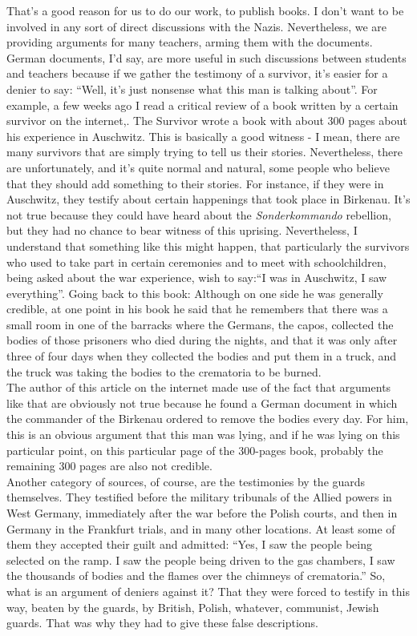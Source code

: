 That's a good reason for us to do our work, to publish books. I don’t want to be involved in any sort of direct discussions with the Nazis. Nevertheless, we are providing arguments for many teachers, arming them with the documents. German documents, I'd say, are more useful in such discussions between students and teachers because if we gather the testimony of a survivor, it’s easier for a denier to say: ``Well, it’s just nonsense what this man is talking about''. For example, a few weeks ago I read a critical review of a book written by a certain survivor on the internet,. The Survivor wrote a book with about 300 pages about his experience in Auschwitz. This is basically a good witness - I mean, there are many survivors that are simply trying to tell us their stories. Nevertheless, there are unfortunately, and it's quite normal and natural, some people who believe that they should add something to their stories. For instance, if they were in Auschwitz, they testify about certain happenings that took place in Birkenau. It’s not true because they could have heard about the \textit{Sonderkommando} rebellion, but they had no chance to bear witness of this uprising. Nevertheless, I understand that something like this might happen, that particularly the survivors who used to take part in certain ceremonies and to meet with schoolchildren, being asked about the war experience, wish to say:``I was in Auschwitz, I saw everything''. Going back to this book: Although on one side he was generally credible, at one point in his book he said that he remembers that there was a small room in one of the barracks where the Germans, the capos, collected the bodies of those prisoners who died during the nights, and that it was only after three of four days when they collected the bodies and put them in a truck, and the truck was taking the bodies to the crematoria to be burned.\\
The author of this article on the internet made use of the fact that arguments like that are obviously not true because he found a German document in which the commander of the Birkenau ordered to remove the bodies every day. For him, this is an obvious argument that this man was lying, and if he was lying on this particular point, on this particular page of the 300-pages book, probably the remaining 300 pages are also not credible.\\
Another category of sources, of course, are the testimonies by the guards themselves. They testified before the military tribunals of the Allied powers in West Germany, immediately after the war before the Polish courts, and then in Germany in the Frankfurt trials, and in many other locations. At least some of them they accepted their guilt and admitted: ``Yes, I saw the people being selected on the ramp. I saw the people being driven to the gas chambers, I saw the thousands of bodies and the flames over the chimneys of crematoria.'' So, what is an argument of deniers against it? That they were forced to testify in this way, beaten by the guards, by British, Polish, whatever, communist, Jewish guards. That was why they had to give these false descriptions. \\
